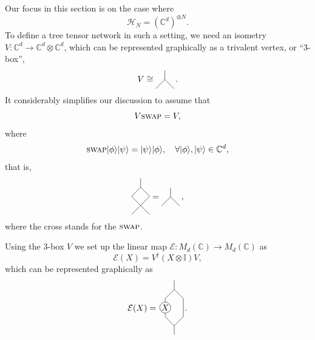 \documentclass[11pt,oneside]{amsart}
\theoremstyle{plain}%
\theoremstyle{definition}
\theoremstyle{remark}
\begin{document}
Our focus in this section is on the case where
\begin{equation}
	\mathcal{H}_N = (\mathbb{C}^d)^{\otimes N}.
\end{equation}
To define a tree tensor network in such a setting, we need an isometry $V\colon\mathbb{C}^d\to\mathbb{C}^d\otimes\mathbb{C}^d$, which can be represented graphically as a trivalent vertex, or ``$3$-box'',
\begin{equation}
    V \cong \tikz[baseline=8pt, scale=0.75]{
      \draw (0.0, 0.0) -- (0.5, 0.5) -- (1.0, 0.0);
      \draw (0.5, 0.5) -- (0.5, 1.0);
    }\, .
\end{equation}
It considerably simplifies our discussion to assume that
\begin{equation}
	V\textsc{swap} = V,
\end{equation}
where
\begin{equation}
	\textsc{swap}|\phi\rangle|\psi\rangle = |\psi\rangle|\phi\rangle, \quad \forall |\phi\rangle, |\psi\rangle\in \mathbb{C}^d,
\end{equation}
that is,
\begin{equation}
    \tikz[baseline=18pt, scale=0.75]{
      \draw (0.0, 1.0) -- (0.5, 1.5) -- (1.0, 1.0);
      \draw (0.5, 1.5) -- (0.5, 2.0);
      \draw (0.0, 1.0) -- (1.0, 0.0);
      \draw (1.0, 1.0) -- (0.0, 0.0);
    }  = \tikz[baseline=8pt, scale=0.75]{
      \draw (0.0, 0.0) -- (0.5, 0.5) -- (1.0, 0.0);
      \draw (0.5, 0.5) -- (0.5, 1.0);
    }\, ,
\end{equation}
where the cross stands for the $\textsc{swap}$.

Using the $3$-box $V$ we set up the linear map $\mathcal{E}\colon M_d(\mathbb{C}) \rightarrow M_d(\mathbb{C})$ as
\begin{equation}
	\mathcal{E}(X) = V^\dag (X\otimes \mathbb{I}) V,
\end{equation}
which can be represented graphically as
\begin{equation}
	\mathcal{E}(X) =
	\tikz[baseline=28.34pt, scale=0.75]{
      \draw (0.0, 1.0) -- (0.0, 1.2);
      \draw (0.0, 1.5) circle [radius=0.3] node {$X$};
      \draw (0.0, 1.8) -- (0.0, 2.0);
      \draw (0.0, 1.0) -- (0.5, 0.5) -- (1.0, 1.0) -- (1.0, 2.0);
      \draw (0.5, 0.0) -- (0.5, 0.5);
      \draw (0.0, 2.0) -- (0.5, 2.5) -- (1.0, 2.0);
      \draw (0.5, 2.5) -- (0.5, 3.0);
    }\, .
\end{equation}
\end{document}
